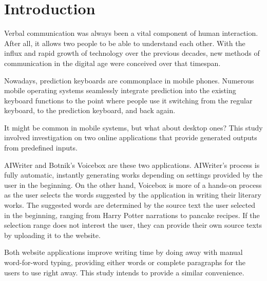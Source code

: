 \documentclass[journal]{./IEEE/IEEEtran}
\title{\SPTITLE}
\author{\ADVISEE
\REMARK
}
\begin{document}
\maketitle

\section{Introduction}

Verbal communication was always been a vital component of human interaction. After all, it allows two people to be able to understand each other. With the influx and rapid growth of technology over the previous decades, new methods of communication in the digital age were conceived over that timespan.


Nowadays, prediction keyboards are commonplace in mobile phones. Numerous mobile operating systems seamlessly integrate prediction into the existing keyboard functions to the point where people use it switching from the regular keyboard, to the prediction keyboard, and back again.

It might be common in mobile systems, but what about desktop ones? This study involved investigation on two online applications that provide generated outputs from predefined inputs.

AIWriter\cite{AIWriter} and Botnik's Voicebox are these two applications. AIWriter's process is fully automatic, instantly generating works depending on settings provided by the user in the beginning. On the other hand, Voicebox is more of a hands-on process as the user selects the words suggested by the application in writing their literary works. The suggested words are determined by the source text the user selected in the beginning, ranging from Harry Potter narrations to pancake recipes. If the selection range does not interest the user, they can provide their own source texts by uploading it to the website.

Both website applications improve writing time by doing away with manual word-for-word typing, providing either words or complete paragraphs for the users to use right away. This study intends to provide a similar convenience.
\end{document}
